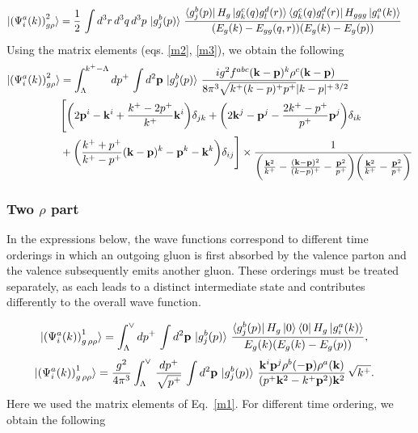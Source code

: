 \documentclass[a4paper,11pt]{article}
\def\v#1{\mathbf{#1}}
\begin{document}
\begin{figure}[htbp]
    \centering
\end{figure}
\begin{align}\label{onegrho2}
  \ket{ \left(\Psi^{a}_{i}(k) \right)^{2}_{g \rho} }
   & = 
\frac{1}{2}\,  \int d^{3}r\, d^{3}q\,  d^{3}p\,
  \ket{g^{b}_{j}(p)}\,
  \frac{\bra{g^{b}_{j}(p)}H_{g}\ket{g^{c}_{k}(q)g^{d}_{l}(r)}\bra{g^{c}_{k}(q)g^{d}_{l}(r)}H_{ggg}\ket{g^{a}_{i}(k)}}{(E_{g}(k)-E_{gg}(q,r))(E_{g }(k)-E_{g}(p))}
\end{align}
Using the matrix elements (eqs. \eqref{m2}, \eqref{m3}), we obtain the following
 \begin{align}
 \ket{ \left(\Psi^{a}_{i}(k) \right)^{2}_{g \rho} }
   &  = \int_{\Lambda}^{k^{+}-\Lambda}dp^{+}\, \int d^{2}\v{p}\, \ket{g^{b}_{j}(p)}\,\frac{ig^{2}f^{abc}(\v{k-p})^{k}\rho^{c}(\v{k-p})}{8\pi^{3}\sqrt{k^{+}(k-p)^{+}p^{+}}|k-p|^{+\, 3/2}}\notag \\ &  \Bigg[\bigg(2\v{p}^{i}-\v{k}^{i} +\frac{k^{+}-2p^{+}}{k^{+}}\v{k}^{i}\bigg)\delta_{jk} +\bigg(2\v{k}^{j}-\v{p}^{j}-\frac{2k^{+}-p^{+}}{p^{+}}\v{p}^{j}\bigg)\delta_{ik}\notag \\ & +\bigg(\frac{k^{+}+p^{+}}{k^{+}-p^{+}}(\v{k-p})^{k}-\v{p}^{k}-\v{k}^{k}\bigg)\delta_{ij}\Bigg]\times \frac{1}{\bigg(\frac{\v{k}^{2}}{k^{+}}-\frac{(\v{k-p})^{2}}{(k-p)^{+}}-\frac{\v{p}^{2}}{p^{+}}\bigg) \bigg(\frac{\v{k}^{2}}{k^{+}}-\frac{\v{p}^{2}}{p^{+}}\bigg)}
\end{align} 

\subsubsection*{Two $\rho$ part}
In the expressions below, the wave functions correspond to different time orderings in which an outgoing gluon is first absorbed by the valence parton and the valence subsequently emits another gluon. These orderings must be treated separately, as each leads to a distinct intermediate state and contributes differently to the overall wave function.

\begin{figure}[htbp]
    \centering
\end{figure}
\begin{align}
  \ket{ \left(\Psi^{a}_{i}(k) \right)^{1}_{g\, \rho \rho} }
   &=\int_{\Lambda}^{\vee} 
   d p^+\, \int d^2\v{p} \,
   \ket{g_{j}^{b}(p)}\,
   \frac{\bra{g_{j}^{b}(p)}H_{g}\ket{0}\bra{0}H_{g}\ket{g_{i}^{a}(k)}}{E_{g}(k) (E_{g}(k) - E_{g}(p))},
   \end{align}  
 \begin{align}
    \ket{ \left(\Psi^{a}_{i}(k) \right)^{1}_{g\, \rho \rho} }
   & =  
   \frac{g^2}{4\pi^3}
  \int_{\Lambda}^{\vee}\,
   \frac{dp^{+}}{\sqrt{p^{+}}}\, \int d^2\v{p}\,\ket{g_{j}^{b}(p)}\,\frac{\v{k}^{i}\v{p}^{j}\rho^{b}(-\v{p})\rho^{a}(\v{k})}{(p^{+} \v{k}^{2} -k^{+}\v{p}^{2}) \v{k}^{2}}\, \sqrt{k^{+}}.
   \label{m1grr}
\end{align}
Here we used the matrix elements of Eq.~\eqref{m1}. For different time ordering, we obtain the following 
\end{document}
